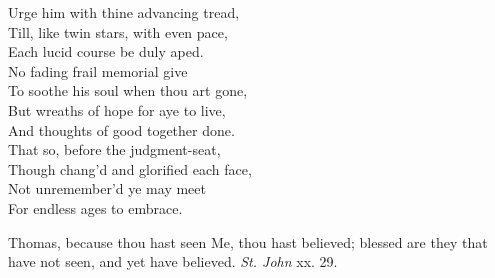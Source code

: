  Urge him with thine advancing tread, \\
 Till, like twin stars, with even pace, \\
 Each lucid course be duly aped. \\
  No fading frail memorial give \\
 To soothe his soul when thou art gone, \\
 But wreaths of hope for aye to live, \\
 And thoughts of good together done. \\
  That so, before the judgment-seat, \\
 Though chang’d and glorified each face, \\
 Not unremember’d ye may meet \\
 For endless ages to embrace.\\


Thomas, because thou hast seen Me, thou hast believed; blessed are they that have not seen, and yet have believed. \emph{St. John} xx. 29.

